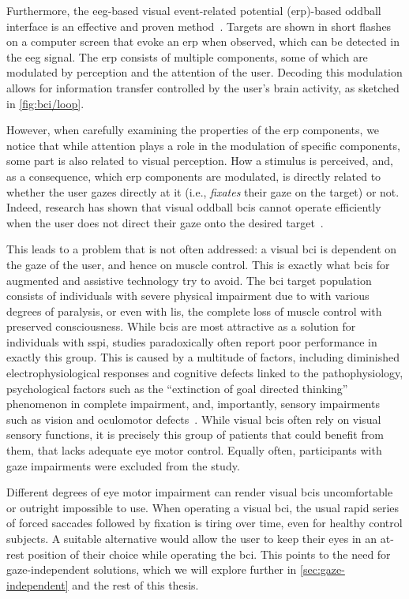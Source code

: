 Furthermore, the \ac{eeg}-based visual event-related potential (\ac{erp})-based oddball
interface is an effective and proven method~\cite{Wolpaw2018,Severens2014}.
Targets are shown in short flashes on a computer screen that evoke an \ac{erp} when
observed, which can be detected in the \ac{eeg} signal.
The \ac{erp} consists of multiple components, some of which are modulated by perception
and the attention of the user.
Decoding this modulation allows for information transfer controlled by the user's brain
activity, as sketched in \cref{fig:bci/loop}.

However, when carefully examining the properties of the \ac{erp} components, we notice
that while attention plays a role in the modulation of specific components, some part is
also related to visual perception.
How a stimulus is perceived, and, as a consequence, which \ac{erp} components are
modulated, is directly related to whether the user gazes directly at it (i.e.,
\emph{fixates} their gaze on the target) or not.
Indeed, research has shown that visual oddball \ac{bci}s cannot operate efficiently when
the user does not direct their gaze onto the desired target~\cite{Brunner2010, Frenzel2011}.

This leads to a problem that is not often addressed:
a visual \ac{bci} is dependent on the gaze of the user, and hence on muscle control.
This is exactly what \acp{bci} for augmented and assistive technology try to avoid.
The \ac{bci} target population consists of individuals with severe physical
impairment due to  with various degrees
of paralysis, or even with \ac{lis}, the complete loss of muscle control with preserved
consciousness.
While \ac{bci}s are most attractive as a solution for individuals with \ac{sspi},
studies paradoxically often report poor performance in exactly this group.
This is caused by a multitude of factors, including diminished
electrophysiological responses and cognitive defects linked to the
pathophysiology, psychological factors such as the ``extinction of goal directed thinking''
phenomenon in complete impairment, and, importantly, sensory impairments such as vision and
oculomotor defects~\cite{Seguin2023}.
While visual \acp{bci} often rely on visual sensory functions, it is precisely this
group of patients that could benefit from them, that lacks adequate eye motor control.
Equally often, participants with gaze impairments were excluded from the study.

Different degrees of eye motor impairment can render visual \ac{bci}s uncomfortable or
outright impossible to use.
When operating a visual \ac{bci}, the usual rapid series of forced saccades followed by
fixation is tiring over time, even for healthy control subjects.
A suitable alternative would allow the user to keep their eyes in an at-rest position of
their choice while operating the \ac{bci}.
This points to the need for gaze-independent solutions, which we will explore further in
\cref{sec:gaze-independent} and the rest of this thesis.
